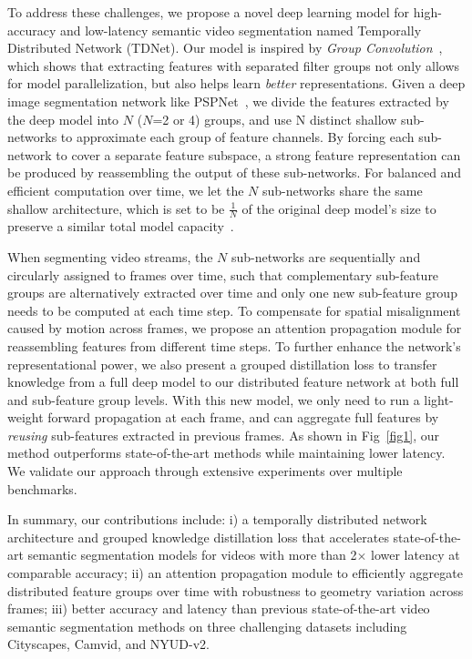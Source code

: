 \documentclass[10pt,twocolumn,letterpaper]{article}
\begin{document}
To address these challenges, we propose a novel deep learning model for high-accuracy and low-latency semantic video segmentation named Temporally Distributed Network (TDNet).
Our model is inspired by \textit{Group Convolution}~\cite{ioannou2017deep,krizhevsky2012imagenet}, which shows that extracting features with separated filter groups not only allows for model parallelization, but also helps learn \emph{better} representations.  
Given a deep image segmentation network like PSPNet~\cite{zhao2017pyramid}, we divide the features extracted by the deep model into $N$ (\eg $N$=2 or 4) groups, and use N distinct shallow sub-networks to approximate each group of feature channels. 
By forcing each sub-network to cover a separate feature subspace, a strong feature representation can be produced by reassembling the output of these sub-networks. 
For balanced and efficient computation over time, we let the $N$ sub-networks share the same shallow architecture, which is set to be $\frac{1}{N}$ of the original deep model's size to preserve a similar total model capacity~\cite{wu2019wider,szegedy2017inception,Zagoruyko2016WRN}. 

When segmenting video streams, the $N$ sub-networks are sequentially and circularly assigned to frames over time, such that complementary sub-feature groups are alternatively extracted over time and only one new sub-feature group needs to be computed at each time step. 
To compensate for spatial misalignment caused by motion across frames, we propose an attention propagation module for reassembling features from different time steps. 
To further enhance the network's representational power, we also present a grouped distillation loss to transfer knowledge from a full deep model to our distributed feature network at both full and sub-feature group levels. With this new model, we only need to run a light-weight forward propagation at each frame, and can aggregate full features by \emph{reusing} sub-features extracted in previous frames.
As shown in Fig~\ref{fig1}, our method outperforms state-of-the-art methods while maintaining lower latency.
We validate our approach through extensive experiments over multiple benchmarks. 

In summary, our contributions include: i) a temporally distributed network architecture and grouped knowledge distillation loss that accelerates state-of-the-art semantic segmentation models for videos with more than 2$\times$ lower latency at comparable accuracy; ii) an attention propagation module to efficiently aggregate distributed feature groups over time with robustness to geometry variation across frames; iii) better accuracy and latency than previous state-of-the-art video semantic segmentation methods on three challenging datasets including Cityscapes, Camvid, and NYUD-v2. 
\end{document}
